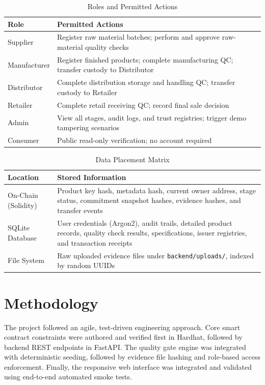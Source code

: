 \documentclass[12pt,a4paper]{report}
\begin{document}
\begin{table}[H]
\centering
\caption{Roles and Permitted Actions}
\label{tab:roles}
\small
\begin{tabularx}{\textwidth}{p{3.0cm} X}
\toprule
\textbf{Role} & \textbf{Permitted Actions} \\
\midrule
Supplier & Register raw material batches; perform and approve raw-material quality checks \\
Manufacturer & Register finished products; complete manufacturing QC; transfer custody to Distributor \\
Distributor & Complete distribution storage and handling QC; transfer custody to Retailer \\
Retailer & Complete retail receiving QC; record final sale decision \\
Admin & View all stages, audit logs, and trust registries; trigger demo tampering scenarios \\
Consumer & Public read-only verification; no account required \\
\bottomrule
\end{tabularx}
\end{table}

\begin{table}[H]
\centering
\caption{Data Placement Matrix}
\label{tab:dataplc}
\small
\begin{tabularx}{\textwidth}{p{3.0cm} X}
\toprule
\textbf{Location} & \textbf{Stored Information} \\
\midrule
On-Chain (Solidity) & Product key hash, metadata hash, current owner address, stage status, commitment snapshot hashes, evidence hashes, and transfer events \\
SQLite Database & User credentials (Argon2), audit trails, detailed product records, quality check results, specifications, issuer registries, and transaction receipts \\
File System & Raw uploaded evidence files under \texttt{backend/uploads/}, indexed by random UUIDs \\
\bottomrule
\end{tabularx}
\end{table}

\section{Methodology}
The project followed an agile, test-driven engineering approach. Core smart contract constraints were authored and verified first in Hardhat, followed by backend REST endpoints in FastAPI. The quality gate engine was integrated with deterministic seeding, followed by evidence file hashing and role-based access enforcement. Finally, the responsive web interface was integrated and validated using end-to-end automated smoke tests.
\end{document}
